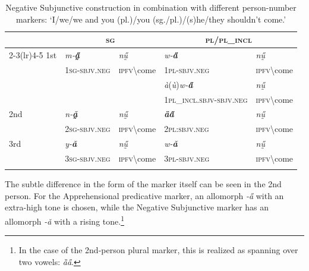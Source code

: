 \documentclass[output=paper,colorlinks,citecolor=brown]{langscibook}
\begin{document}
\begin{table}

\begin{tabular}{l ll ll}
\lsptoprule
 & \multicolumn{2}{c}{\textsc{sg}} & \multicolumn{2}{c}{\textsc{pl}/\textsc{pl\_incl}} \\ \cmidrule(lr){2-3}\cmidrule(lr){4-5}
1st & \textit{m‑\textbf{a̰̋}}  & \textit{nṵ̋} & \textit{w‑\textbf{a̋}} & \textit{nṵ̋} \\
 & \textsc{1sg-sbjv.neg} & \textsc{ipfv}\backslash come & \textsc{1pl-sbjv.neg} & \textsc{ipfv}\backslash come \\
 &  &  & \textit{à}(\textit{ù})\textit{w‑\textbf{a̋}} & \textit{nṵ̋} \\
 &  &  & \textsc{1pl\_incl.sbjv-sbjv.neg} & \textsc{ipfv}\backslash come \\
\addlinespace
2nd & \textit{n‑\textbf{ǎ̰}} & \textit{nṵ̋} & \textit{\textbf{ȁa̋}} & \textit{nṵ̋} \\
    & \textsc{2sg-sbjv.neg} & \textsc{ipfv}\backslash come & \textsc{2pl:sbjv.neg} & \textsc{ipfv}\backslash come \\
\addlinespace
3rd & \textit{y-\textbf{ǎ}} & \textit{nṵ̋} & \textit{w-\textbf{ǎ}} & \textit{nṵ̋} \\
 & \textsc{3sg-sbjv.neg} & \textsc{ipfv}\backslash come & \textsc{3pl-sbjv.neg} & \textsc{ipfv}\backslash come \\
\lspbottomrule
\end{tabular}
\caption{Negative Subjunctive construction in combination with different person-number markers: `I/we/we and you (pl.)/you (sg./pl.)/(s)he/they shouldn't come.'}
\label{tab2}
\end{table}


The subtle difference in the form of the marker itself can be seen in the 2nd person. For the Apprehensional predicative marker, an allomorph \textit{-a̋} with an extra-high tone is chosen, while the Negative Subjunctive marker has an allomorph \textit{-ǎ} with a rising tone.\footnote{In the case of the 2nd-person plural marker, this is realized as spanning over two vowels: \textit{ȁa̋}.}
\end{document}
